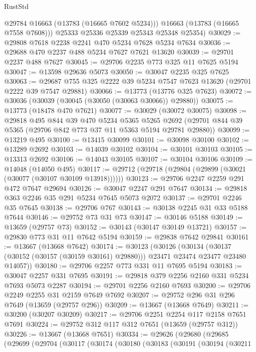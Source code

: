 \begin{lexlean}{RustStd}
\begin{coremodule}
          @29784
          @16663
          (@13783 (@16665 @7602 @5234)))
        @16663
        (@13783 (@16665 @7558 @7608)))
      @25333
      @25336
      @25339
      @25343
      @25348
      @25354)
@30029 := @29808 @7618 @2238 @2241 @470 @5234 @7628 @5234 @7634
@30036 := @29688 @470 @2237 @488 @5234 @7627 @7621 @13620
@30039 := @29701 @2237 @488 @7627
@30045 := @29706 @2235 @773 @325 @11 @7625 @5194
@30047 := @13598 @29636 @5073
@30050 := @30047 @2235 @325 @7625
@30063 := @29687 @755 @325 @2222 @39 @5234 @7547 @7623 @13620 (@29701 @2222 @39 @7547 @29881)
@30066 := @13773 (@13776 @325 @7623)
@30072 := @30036 (@30039 (@30045 (@30050 (@30063 @30066)) @29880))
@30075 := @13773 (@18478 @470 @7621)
@30077 := @30029 (@30072 @30075)
@30098 := @29818
    @495
    @844
    @39
    @470
    @5234
    @5365
    @5265
    @2692
    (@29701 @844 @39 @5365 (@29706 @842 @773 @37 @11 @5363 @5194 @29781 @29880))
@30099 := @13219 @495
@30100 := @13415 @30099
@30101 := @30098 @30100
@30102 := @13289 @2692
@30103 := @14039 @30102
@30104 := @30101 @30103
@30105 := @13313 @2692
@30106 := @14043 @30105
@30107 := @30104 @30106
@30109 := @14048 (@14050 @495)
@30117 := @29712 (@29718 (@29804 (@29899 (@30021 (@30077 (@30107 @30109 @13918))))))
@30123 := @29706 @2247 @2259 @291 @472 @7647 @29694
@30126 := @30047 @2247 @291 @7647
@30134 := @29818 @363 @2246 @35 @291 @5234 @7645 @5073 @2072
@30137 := @29701 @2246 @35 @7645
@30138 := @29706 @767
@30143 := @30138 @2245 @31 @33 @5188 @7644
@30146 := @29752 @73 @31 @73
@30147 := @30146 @5188
@30149 := @13659 (@29757 @73)
@30152 := @30143 (@30147 @30149 @13721)
@30157 := @29830 @773 @31 @11 @7642 @5194
@30159 := @29838 @7642 @29841
@30161 := @13667 (@13668 @7642)
@30174 := @30123
    (@30126
      (@30134 (@30137 (@30152 (@30157 (@30159 @30161) @29880))) @23471 @23474 @23477 @23480 @14057))
@30180 := @29706 @2257 @773 @331 @11 @7695 @5194
@30183 := @30047 @2257 @331 @7695
@30191 := @29818 @379 @2256 @2160 @331 @5234 @7693 @5073 @2287
@30194 := @29701 @2256 @2160 @7693
@30200 := @29706 @2249 @2255 @31 @2159 @7649 @7692
@30207 := @29752 @296 @31 @296 @7649 (@13659 (@29757 @296))
@30209 := @13667 (@13668 @7649)
@30211 := @30200 (@30207 @30209)
@30217 := @29706 @2251 @2254 @117 @2158 @7651 @7691
@30224 := @29752 @312 @117 @312 @7651 (@13659 (@29757 @312))
@30226 := @13667 (@13668 @7651)
@30334 := @29626
    (@29680
      (@29685
        (@29699
          (@29704
            (@30117
              (@30174
                (@30180
                  (@30183
                    (@30191
                      (@30194
                        (@30211

\end{coremodule}
\end{lexlean}
